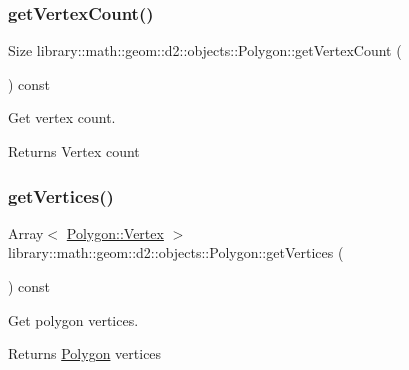 \subsubsection{\texorpdfstring{get\+Vertex\+Count()}{getVertexCount()}}
{\footnotesize\ttfamily Size library\+::math\+::geom\+::d2\+::objects\+::\+Polygon\+::get\+Vertex\+Count (\begin{DoxyParamCaption}{ }\end{DoxyParamCaption}) const}



Get vertex count. 

\begin{DoxyReturn}{Returns}
Vertex count 
\end{DoxyReturn}
\mbox{\label{classlibrary_1_1math_1_1geom_1_1d2_1_1objects_1_1_polygon_ae73d59e0e0bb5d13bd69e2924e602e20}} 
\subsubsection{\texorpdfstring{get\+Vertices()}{getVertices()}}
{\footnotesize\ttfamily Array$<$ \hyperlink{classlibrary_1_1math_1_1geom_1_1d2_1_1objects_1_1_polygon_a1559cddbcb23d41f2be9e389b0ccd127}{Polygon\+::\+Vertex} $>$ library\+::math\+::geom\+::d2\+::objects\+::\+Polygon\+::get\+Vertices (\begin{DoxyParamCaption}{ }\end{DoxyParamCaption}) const}



Get polygon vertices. 

\begin{DoxyReturn}{Returns}
\hyperlink{classlibrary_1_1math_1_1geom_1_1d2_1_1objects_1_1_polygon}{Polygon} vertices 
\end{DoxyReturn}
\mbox{\label{classlibrary_1_1math_1_1geom_1_1d2_1_1objects_1_1_polygon_a83e0962f91f0732048e156ad634faaea}} 
